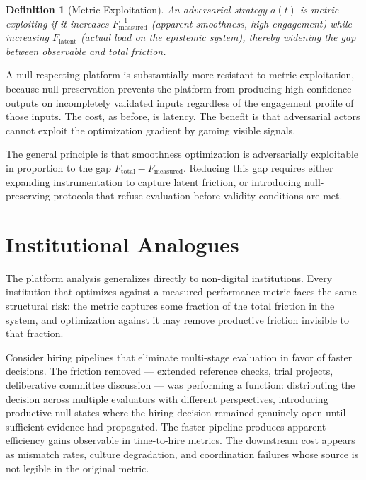 \documentclass[11pt]{article}
\newtheorem{definition}{Definition}
\theoremstyle{remark}
\begin{document}
\begin{definition}[Metric Exploitation]
An adversarial strategy $a(t)$ is metric-exploiting if it increases $F_{\text{measured}}^{-1}$ (apparent smoothness, high engagement) while increasing $F_{\text{latent}}$ (actual load on the epistemic system), thereby widening the gap between observable and total friction.
\end{definition}

A null-respecting platform is substantially more resistant to metric exploitation, because null-preservation prevents the platform from producing high-confidence outputs on incompletely validated inputs regardless of the engagement profile of those inputs. The cost, as before, is latency. The benefit is that adversarial actors cannot exploit the optimization gradient by gaming visible signals.

The general principle is that smoothness optimization is adversarially exploitable in proportion to the gap $F_{\text{total}} - F_{\text{measured}}$. Reducing this gap requires either expanding instrumentation to capture latent friction, or introducing null-preserving protocols that refuse evaluation before validity conditions are met.

\section{Institutional Analogues}
\label{sec:institutional_analogues}

The platform analysis generalizes directly to non-digital institutions. Every institution that optimizes against a measured performance metric faces the same structural risk: the metric captures some fraction of the total friction in the system, and optimization against it may remove productive friction invisible to that fraction.

Consider hiring pipelines that eliminate multi-stage evaluation in favor of faster decisions. The friction removed --- extended reference checks, trial projects, deliberative committee discussion --- was performing a function: distributing the decision across multiple evaluators with different perspectives, introducing productive null-states where the hiring decision remained genuinely open until sufficient evidence had propagated. The faster pipeline produces apparent efficiency gains observable in time-to-hire metrics. The downstream cost appears as mismatch rates, culture degradation, and coordination failures whose source is not legible in the original metric.
\end{document}
